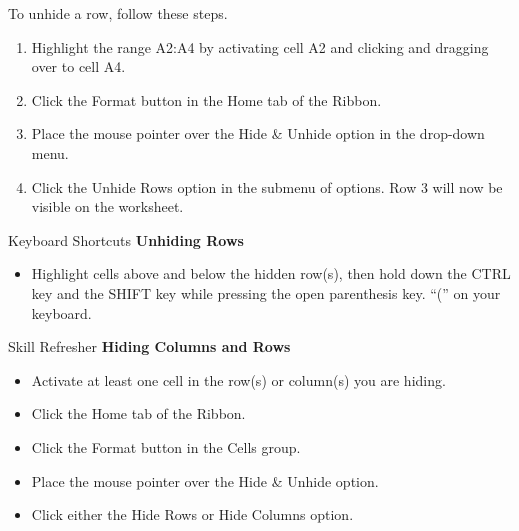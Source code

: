 To unhide a row, follow these steps.

\begin{enumerate}
	\item Highlight the range \textsf{A2:A4} by activating cell \textsf{A2} and clicking and dragging over to cell \textsf{A4}.
	\item Click the Format button in the Home tab of the Ribbon.
	\item Place the mouse pointer over the Hide \& Unhide option in the drop-down menu.
	\item Click the Unhide Rows option in the submenu of options. Row 3 will now be visible on the worksheet.
\end{enumerate}

\begin{center}
	\begin{shtcutbox}{Keyboard Shortcuts}
		\textbf{Unhiding Rows}
		\\
		\begin{itemize}
			\setlength{\itemsep}{0pt}
			\setlength{\parskip}{0pt}
			\setlength{\parsep}{0pt}
			
			\item Highlight cells above and below the hidden row(s), then hold down the CTRL key and the SHIFT key while pressing the open parenthesis key. ``('' on your keyboard.
			
		\end{itemize}
	\end{shtcutbox}
\end{center}

\begin{center}
	\begin{sklbox}{Skill Refresher}
		\textbf{Hiding Columns and Rows}
		\\
		\begin{itemize}
			\setlength{\itemsep}{0pt}
			\setlength{\parskip}{0pt}
			\setlength{\parsep}{0pt}
			
			\item Activate at least one cell in the row(s) or column(s) you are hiding.
			\item Click the Home tab of the Ribbon.
			\item Click the Format button in the Cells group.
			\item Place the mouse pointer over the Hide \& Unhide option.
			\item Click either the Hide Rows or Hide Columns option.
			
		\end{itemize}
	\end{sklbox}
\end{center}


